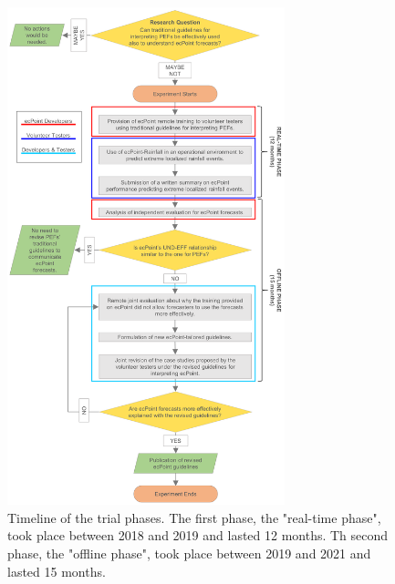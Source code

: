 \documentclass[twocol]{ametsocV5} %
\begin{document}
\begin{figure}
\centerline{\includegraphics[width=19pc]{manuscript/Figures/FlowChart.png}}
\caption{Timeline of the trial phases. The first phase, the "real-time phase", took place between 2018 and 2019 and lasted 12 months. Th second phase, the "offline phase", took place between 2019 and 2021 and lasted 15 months.}
\label{FlowChart}
\end{figure}
\end{document}
